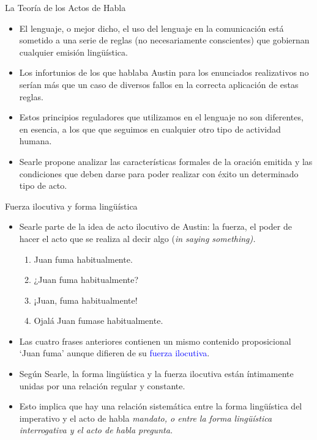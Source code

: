 \documentclass{beamer}
\begin{document}
\begin{frame}{La Teoría de los Actos de Habla}

	\begin{itemize}
		\item El lenguaje, o mejor dicho, el uso del lenguaje en la comunicación está sometido a una serie de reglas (no necesariamente conscientes) que gobiernan cualquier emisión lingüística.
		\item Los infortunios de los que hablaba Austin para los enunciados realizativos no serían más que un caso de diversos fallos  en la correcta aplicación de estas reglas. 
		\item Estos principios reguladores que utilizamos en el lenguaje no son diferentes, en esencia, a los que que seguimos en cualquier otro tipo de actividad humana. 
		\item Searle propone analizar las características formales de la oración emitida y las condiciones que deben darse para poder realizar con éxito un determinado tipo de acto.
	\end{itemize}

\end{frame}

\begin{frame}{Fuerza ilocutiva y forma lingüística}

\begin{itemize}
	\item Searle parte de la idea de acto ilocutivo de Austin: la fuerza, el poder de hacer el acto que se realiza al decir algo (\it{in saying something}).
	\begin{enumerate}
		\item Juan fuma habitualmente.
		\item ¿Juan fuma habitualmente?
		\item ¡Juan, fuma habitualmente!
		\item Ojalá Juan fumase habitualmente.
	\end{enumerate}
	\item Las cuatro frases anteriores contienen un mismo contenido proposicional `Juan fuma' aunque difieren de su \textcolor{blue}{fuerza ilocutiva}.
	\item Según Searle, la forma lingüística y la fuerza ilocutiva están íntimamente unidas por una relación regular y constante. 
	\item Esto implica que hay una relación sistemática entre la forma lingüística del imperativo y el acto de habla \it{mandato}, o entre la forma lingüística interrogativa y el acto de habla \it{pregunta}.
\end{itemize}
\end{frame}
\end{document}
